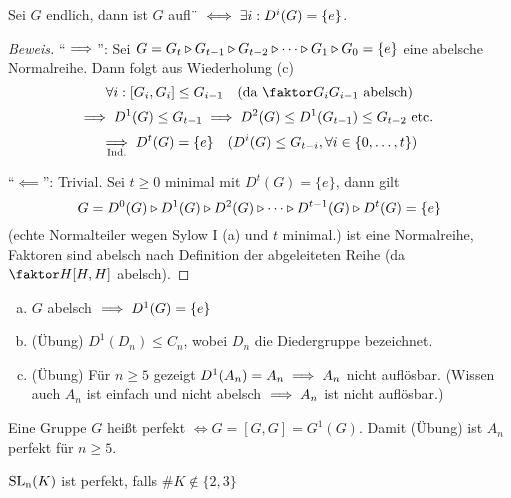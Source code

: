 \documentclass[a4paper]{report}
\begin{document}
\begin{satz}
  Sei $G$ endlich, dann ist $G$ aufl¨ $\iff \exists i : D^{i}(G) = \{e\}$.
  \begin{proof}[Beweis]
    \item ``$\implies$'': Sei $G = G_{t} \triangleright G_{t-1} \triangleright G_{t-2} \triangleright \cdots \triangleright G_{1} \triangleright G_{0} = \{e\}$ eine abelsche Normalreihe. Dann folgt aus Wiederholung (c)
    \[\forall i : [G_{i}, G_{i}] \le G_{i-1} \quad \text{(da } \fak {G_{i}}{G_{i-1}} \text{ abelsch)}\]
    \[\implies D^{1}(G) \le G_{t-1} \implies D^{2}(G) \le D^{1}(G_{t-1}) \le G_{t-2} \text{ etc. }\]
    \[\underset{\text{Ind.}}{\implies} D^{t}(G) = \{e\} \quad (D^{i}(G) \le G_{t-i}, \forall i \in \{0, \ldots, t\})\]
    \item ``$\impliedby$'': Trivial. Sei $t \ge 0$  minimal mit $D^{t}(G) = \{e\}$, dann gilt
    \[G = D^{0}(G) \triangleright D^{1}(G) \triangleright D^{2}(G) \triangleright \cdots \triangleright D^{t-1}(G) \triangleright D^{t}(G) = \{e\}\]
    (echte Normalteiler wegen Sylow I (a) und $t$ minimal.) ist eine Normalreihe, Faktoren sind abelsch nach Definition der abgeleiteten Reihe (da $\fak{H}{[H, H]}$ abelsch).
  \end{proof}
\end{satz}

\begin{bsp}\item
 \begin{enumerate}[(a)]
  \item  $G$ abelsch $\implies D^{1}(G) = \{e\}$
  \item (Übung) $D^{1}(D_{n}) \le C_{n}$, wobei $D_{n}$ die Diedergruppe bezeichnet.
   \item (Übung) Für $n \ge 5$ gezeigt $D^{1}(A_{n}) = A_{n} \implies A_{n}$ nicht auflösbar.
         (Wissen auch $A_{n}$ ist einfach und nicht abelsch $\implies A_{n}$ ist nicht auflösbar.)
 \end{enumerate}
\end{bsp}

\begin{defi}
  Eine Gruppe $G$ heißt perfekt $\iff G = [G, G] = G^{1}(G)$. Damit (Übung) ist $A_{n}$ perfekt für $n \ge 5$.
  \begin{bem*} $\operatorname{SL_n}(K)$ ist perfekt, falls $\#K \notin \{2, 3\}$
  \end{bem*}
\end{defi}
\end{document}
